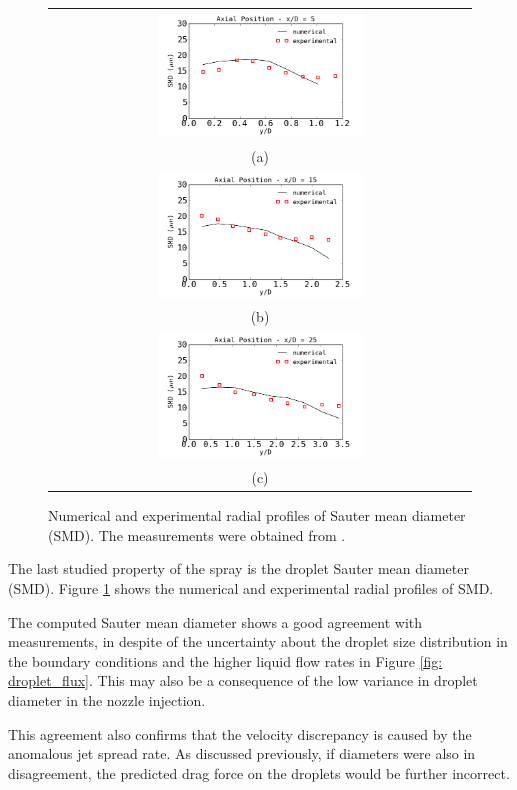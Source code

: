 \begin{figure}[!htb]
 \centering
\begin{tabular}{c}
 \includegraphics[width=0.5\textwidth]{./figuras/chap5/smd/smd5.png} \\
(a) \\
 \includegraphics[width=0.5\textwidth]{./figuras/chap5/smd/smd15.png} \\
(b) \\
 \includegraphics[width=0.5\textwidth]{./figuras/chap5/smd/smd25.png} \\
(c) 
\end{tabular}
 \caption{Numerical and experimental radial profiles of Sauter mean diameter (SMD). The measurements were obtained from \cite{chen}.}
 \label{fig: SMDprofile}
\end{figure}

The last studied property of the spray is the droplet Sauter mean diameter (SMD). Figure \ref{fig: SMDprofile} shows the numerical and experimental radial profiles of SMD.

The computed Sauter mean diameter shows a good agreement with measurements, in despite of the uncertainty about the droplet size distribution in the boundary conditions and the higher liquid flow rates in Figure \ref{fig: droplet_flux}. This may also be a consequence of the low variance in droplet diameter in the nozzle injection.

This agreement also confirms that the velocity discrepancy is caused by the anomalous jet spread rate. As discussed previously, if diameters were also in disagreement, the predicted drag force on the droplets would be further incorrect.


\FloatBarrier

